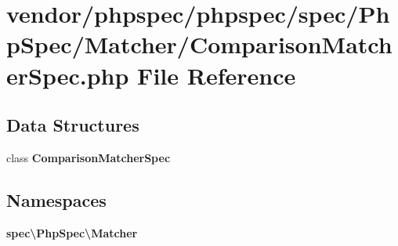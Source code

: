 \section{vendor/phpspec/phpspec/spec/\+Php\+Spec/\+Matcher/\+Comparison\+Matcher\+Spec.php File Reference}
\label{_comparison_matcher_spec_8php}
\subsection*{Data Structures}
\begin{DoxyCompactItemize}
\item 
class {\bf Comparison\+Matcher\+Spec}
\end{DoxyCompactItemize}
\subsection*{Namespaces}
\begin{DoxyCompactItemize}
\item 
 {\bf spec\textbackslash{}\+Php\+Spec\textbackslash{}\+Matcher}
\end{DoxyCompactItemize}
